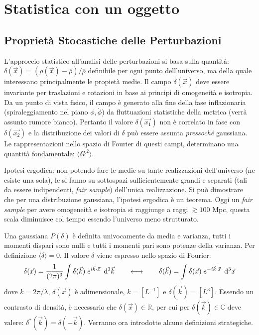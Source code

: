 \chapter{Statistica con un oggetto}\label{8:ch}

\section{Proprietà Stocastiche delle Perturbazioni}
L'approccio statistico all'analisi delle perturbazioni si basa sulla quantità: $\delta (\vec{x}) = \left (\rho(\vec{x})-\overline{\rho} \right)/\overline{\rho}$ definibile per ogni punto dell'universo, ma della quale interessano principalmente le propietà medie. Il campo $\delta (\vec{x})$ deve essere invariante per traslazioni e rotazioni in base ai principi di omogeneità e isotropia. Da un punto di vista fisico, il campo è generato alla fine della fase inflazionaria (spiraleggiamento nel piano $\phi,\dot{\phi}$) da fluttuazioni statistiche della metrica (verrà assunto rumore bianco). Pertanto il valore $\delta (\vec{x_1})$ non è correlato in fase con $\delta (\vec{x_2})$ e la distribuzione dei valori di $\delta$ può essere assunta \textit{pressoché} gaussiana. Le rappresentazioni nello spazio di Fourier di questi campi, determinano una quantità fondamentale: $\langle \delta k^2 \rangle $.

Ipotesi ergodica: non potendo fare le medie su tante realizzazioni dell'universo (ne esiste una sola), le si fanno su sottospazi sufficientemente grandi e separati (tali da essere indipendenti, \textit{fair sample}) dell'unica realizzazione. Si può dimostrare che per una distribuzione gaussiana, l'ipotesi ergodica è un teorema. Oggi un \textit{fair sample} per avere omogeneità e isotropia si raggiunge a raggi $\gtrsim 100$ Mpc, questa scala diminuisce col tempo essendo l'universo meno strutturato. 

Una gaussiana $P(\delta)$ è definita univocamente da media e varianza, tutti i momenti dispari sono nulli e tutti i momenti pari sono potenze della varianza. Per definizione $\langle \delta \rangle =0 $. Il valore $\delta$ viene espresso nello spazio di Fourier:
\begin{equation}
    \delta{(\vec{x})}=\frac{1}{(2\pi)^3}\int \delta{(\vec{k})}\; e^{i\vec{k}\cdot\vec{x}}\; \operatorname{d}\!{^3 \vec{k}} \qquad \longleftrightarrow \qquad \delta{(\vec{k})}=\int \delta{(\vec{x})}\; e^{-i\vec{k}\cdot\vec{x}}\; \operatorname{d}\!{^3 \vec{x}}
\end{equation}
dove $k=2\pi/\lambda$, $\delta{(\vec{x})}$ è adimensionale, $k=[L^{-1}]$ e $\delta{(\vec{k})}=[L^3]$. Essendo un contrasto di densità, è necessario che $\delta{(\vec{x})}\in \mathbb{R} $, per cui per $\delta{(\vec{k})}\in\mathbb{C} $ deve valere: $\delta^*(\vec{k})=\delta{(-\vec{k})}$. Verranno ora introdotte alcune definizioni strategiche.

